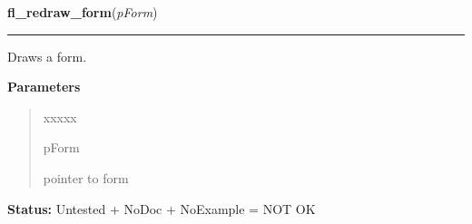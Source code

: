     \label{xformslib:library:fl_redraw_form}

    \vspace{0.5ex}

\hspace{.8\funcindent}\begin{boxedminipage}{\funcwidth}

    \raggedright \textbf{fl\_redraw\_form}(\textit{pForm})

    \vspace{-1.5ex}

    \rule{\textwidth}{0.5\fboxrule}
\setlength{\parskip}{2ex}
    Draws a form.

\setlength{\parskip}{1ex}
      \textbf{Parameters}
      \vspace{-1ex}

      \begin{quote}
        \begin{Ventry}{xxxxx}

          \item[pForm]

          pointer to form

        \end{Ventry}

      \end{quote}

\textbf{Status:} Untested + NoDoc + NoExample = NOT OK



    \end{boxedminipage}

    \label{xformslib:library:fl_set_form_dblbuffer}

    \vspace{0.5ex}

